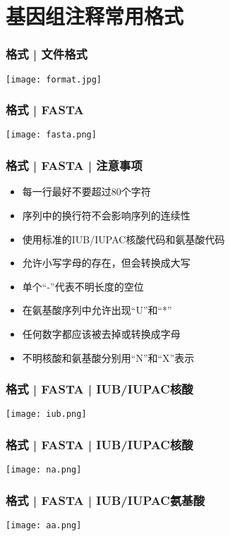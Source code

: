 \section{基因组注释常用格式}
\begin{frame}
  \frametitle{格式 | 文件格式}
    \begin{center}
      \texttt{[image: format.jpg]}
    \end{center}
\end{frame}

\begin{frame}
  \frametitle{格式 | FASTA}
    \begin{center}
      \texttt{[image: fasta.png]}
    \end{center}
\end{frame}

\begin{frame}
  \frametitle{格式 | FASTA | 注意事项}
  \begin{itemize}
    \item 每一行最好不要超过80个字符
    \item 序列中的换行符不会影响序列的连续性
    \item 使用标准的IUB/IUPAC核酸代码和氨基酸代码
    \item 允许小写字母的存在，但会转换成大写
    \item 单个“-”代表不明长度的空位
    \item 在氨基酸序列中允许出现“U”和“*”
    \item 任何数字都应该被去掉或转换成字母
    \item 不明核酸和氨基酸分别用“N”和“X”表示
  \end{itemize}
\end{frame}

\begin{frame}
  \frametitle{格式 | FASTA | IUB/IUPAC核酸}
    \begin{center}
      \texttt{[image: iub.png]}
    \end{center}
\end{frame}

\begin{frame}
  \frametitle{格式 | FASTA | IUB/IUPAC核酸}
    \begin{center}
      \texttt{[image: na.png]}
    \end{center}
\end{frame}

\begin{frame}
  \frametitle{格式 | FASTA | IUB/IUPAC氨基酸}
    \begin{center}
      \texttt{[image: aa.png]}
    \end{center}
\end{frame}

